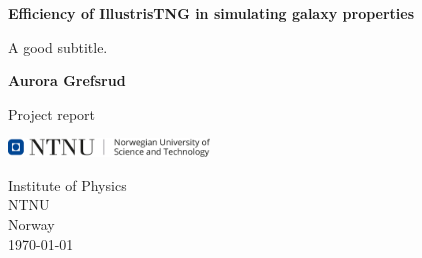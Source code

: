 \begin{titlepage}
   \begin{center}
       \vspace*{1cm}

       \textbf{Efficiency of IllustrisTNG in simulating galaxy properties}

       \vspace{0.5cm}
        A good subtitle. %
            
       \vspace{1.5cm}

       \textbf{Aurora Grefsrud}

       \vfill
            
       Project report\\
            
       \vspace{0.8cm}
     
       \includegraphics[width=0.4\textwidth]{images/ntnu.png}
            
       Institute of Physics\\
       NTNU\\
       Norway\\
       \today
            
   \end{center}
\end{titlepage}